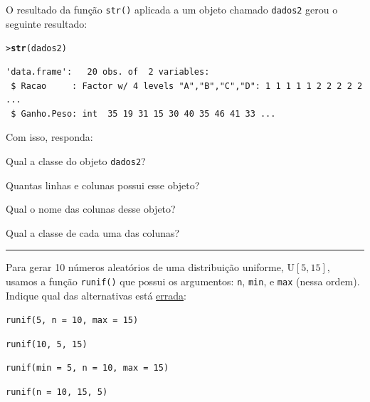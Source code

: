 \documentclass[a4paper,11pt,fleqn]{article}\usepackage[]{graphicx}\usepackage[]{color}
\makeatletter
\newcommand{\hlstd}[1]{\textcolor[rgb]{0,0,0}{#1}}%
\newcommand{\hlkwd}[1]{\textcolor[rgb]{0,0,0}{\textbf{#1}}}%
\newenvironment{kframe}{%
 \def\at@end@of@kframe{}%
 \ifinner\ifhmode%
  \def\at@end@of@kframe{\end{minipage}}%
  \begin{minipage}{\columnwidth}%
 \fi\fi%
 \def\FrameCommand##1{\hskip\@totalleftmargin \hskip-\fboxsep
 \colorbox{shadecolor}{##1}\hskip-\fboxsep
     \hskip-\linewidth \hskip-\@totalleftmargin \hskip\columnwidth}%
 \MakeFramed {\advance\hsize-\width
   \@totalleftmargin\z@ \linewidth\hsize
   \@setminipage}}%
 {\par\unskip\endMakeFramed%
 \at@end@of@kframe}
\newenvironment{knitrout}{}{} %
\theoremstyle{definition}
\makeatother
\begin{document}
\begin{compactenum}[14.]
\item O resultado da função \texttt{str()} aplicada a um objeto chamado
  \texttt{dados2} gerou o seguinte resultado:

\begin{knitrout}\small
{}\color{fgcolor}\begin{kframe}
\begin{alltt}
\hlstd{> }\hlkwd{str}\hlstd{(dados2)}
\end{alltt}
\begin{verbatim}
'data.frame':	20 obs. of  2 variables:
 $ Racao     : Factor w/ 4 levels "A","B","C","D": 1 1 1 1 1 2 2 2 2 2 ...
 $ Ganho.Peso: int  35 19 31 15 30 40 35 46 41 33 ...
\end{verbatim}
\end{kframe}
\end{knitrout}
Com isso, responda:
\begin{compactenum}
  \item Qual a classe do objeto \texttt{dados2}? \newline
  \item Quantas linhas e colunas possui esse objeto? \newline
  \item Qual o nome das colunas desse objeto? \newline
  \item Qual a classe de cada uma das colunas? \newline
\end{compactenum}
\end{compactenum}

\vspace{0.3cm}
\hrule
\vspace{0.3cm}

\begin{compactenum}[15.]
\item Para gerar 10 números aleatórios de uma distribuição uniforme,
  $\text{U}[5,15]$, usamos a função \texttt{runif()} que possui os
  argumentos: \texttt{n}, \texttt{min}, e \texttt{max} (nessa
  ordem). Indique qual das alternativas está \underline{errada}:
  \begin{compactenum}
      \item \texttt{runif(5, n = 10, max = 15)}
      \item \texttt{runif(10, 5, 15)}
      \item \texttt{runif(min = 5, n = 10, max = 15)}
      \item \texttt{runif(n = 10, 15, 5)}
  \end{compactenum}
\end{compactenum}
\end{document}
